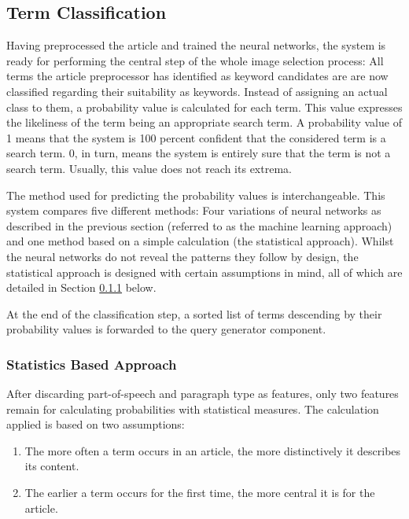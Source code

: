 \documentclass[11pt,a4paper,twoside]{article}
\begin{document}
\subsection{Term Classification} \label{SystemClassification}

Having preprocessed the article and trained the neural networks, the system is ready for performing the central step of the whole image selection process: All terms the article preprocessor has identified as keyword candidates are are now classified regarding their suitability as keywords. Instead of assigning an actual class to them, a probability value is calculated for each term. This value expresses the likeliness of the term being an appropriate search term. A probability value of 1 means that the system is 100 percent confident that the considered term is a search term. 0, in turn, means the system is entirely sure that the term is not a search term. Usually, this value does not reach its extrema.

The method used for predicting the probability values is interchangeable. This system compares five different methods: Four variations of neural networks as described in the previous section (referred to as the machine learning approach) and one method based on a simple calculation (the statistical approach). Whilst the neural networks do not reveal the patterns they follow by design, the statistical approach is designed with certain assumptions in mind, all of which are detailed in Section \ref{SystemClassificationStat} below. 

At the end of the classification step, a sorted list of terms descending by their probability values is forwarded to the query generator component.

\subsubsection{Statistics Based Approach} \label{SystemClassificationStat}

After discarding part-of-speech and paragraph type as features, only two features remain for calculating probabilities with statistical measures. The calculation applied is based on two assumptions:

\begin{enumerate}
    \item The more often a term occurs in an article, the more distinctively it describes its content.
    \item The earlier a term occurs for the first time, the more central it is for the article.
\end{enumerate}
\end{document}
